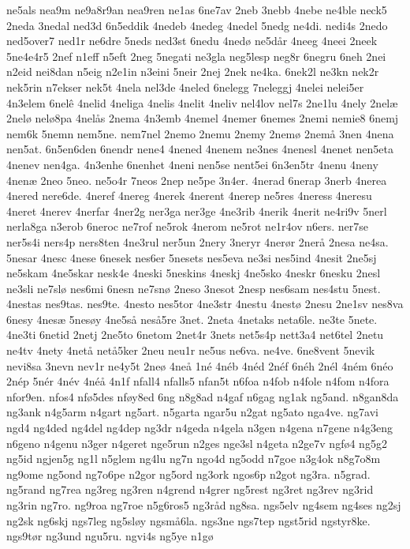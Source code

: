 {ne5als
nea9m
ne9a8r9an
nea9ren
ne1as
6ne7av
2neb
3nebb
4nebe
ne4ble
neck5
2neda
3nedal
ned3d
6n5eddik
4nedeb
4nedeg
4nedel
5nedg
ne4di.
nedi4s
2nedo
ned5over7
ned1r
ne6dre
5neds
ned3st
6nedu
4nedø
ne5dår
4neeg
4neei
2neek
5ne4e4r5
2nef
n1eff
n5eft
2neg
5negati
ne3gla
neg5lesp
neg8r
6negru
6neh
2nei
n2eid
nei8dan
n5eig
n2e1in
n3eini
5neir
2nej
2nek
ne4ka.
6nek2l
ne3kn
nek2r
nek5rin
n7ekser
nek5t
4nela
nel3de
4neled
6nelegg
7neleggj
4nelei
nelei5er
4n3elem
6nelê
4nelid
4neliga
4nelis
4nelit
4neliv
nel4lov
nel7s
2ne1lu
4nely
2nelæ
2nelø
nelø8pa
4nelås
2nema
4n3emb
4nemel
4nemer
6nemes
2nemi
nemie8
6nemj
nem6k
5nemn
nem5ne.
nem7nel
2nemo
2nemu
2nemy
2nemø
2nemå
3nen
4nena
nen5at.
6n5en6den
6nendr
nene4
4nened
4nenem
ne3nes
4nenesl
4nenet
nen5eta
4nenev
nen4ga.
4n3enhe
6nenhet
4neni
nen5se
nent5ei
6n3en5tr
4nenu
4neny
4nenæ
2neo
5neo.
ne5o4r
7neos
2nep
ne5pe
3n4er.
4nerad
6nerap
3nerb
4nerea
4nered
nere6de.
4neref
4nereg
4nerek
4nerent
4nerep
ne5res
4neress
4neresu
4neret
4nerev
4nerfar
4ner2g
ner3ga
ner3ge
4ne3rib
4nerik
4nerit
ne4ri9v
5nerl
nerla8ga
n3erob
6neroc
ne7rof
ne5rok
4nerom
ne5rot
ne1r4ov
n6ers.
ner7se
ner5s4i
ners4p
ners8ten
4ne3rul
ner5un
2nery
3neryr
4nerør
2nerå
2nesa
ne4sa.
5nesar
4nesc
4nese
6nesek
nes6er
5nesets
nes5eva
ne3si
nes5ind
4nesit
2ne5sj
ne5skam
4ne5skar
nesk4e
4neski
5neskins
4neskj
4ne5sko
4neskr
6nesku
2nesl
ne3sli
ne7slø
nes6mi
6nesn
ne7snø
2neso
3nesot
2nesp
nes6sam
nes4stu
5nest.
4nestas
nes9tas.
nes9te.
4nesto
nes5tor
4ne3str
4nestu
4nestø
2nesu
2ne1sv
nes8va
6nesy
4nesæ
5nesøy
4ne5så
neså5re
3net.
2neta
4netaks
neta6le.
ne3te
5nete.
4ne3ti
6netid
2netj
2ne5to
6netom
2net4r
3nets
net5s4p
nett3a4
net6tel
2netu
ne4tv
4nety
4netå
netå5ker
2neu
neu1r
ne5us
ne6va.
ne4ve.
6ne8vent
5nevik
nevi8sa
3nevn
nev1r
ne4y5t
2neø
4neå
1né
4néb
4néd
2néf
6néh
2nél
4ném
6néo
2nép
5nér
4név
4néå
4n1f
nfall4
nfalls5
nfan5t
n6foa
n4fob
n4fole
n4fom
n4fora
nfor9en.
nfos4
nfø5des
nføy8ed
6ng
n8g8ad
n4gaf
n6gag
ng1ak
ng5and.
n8gan8da
ng3ank
n4g5arm
n4gart
ng5art.
n5garta
ngar5u
n2gat
ng5ato
nga4ve.
ng7avi
ngd4
ng4ded
ng4del
ng4dep
ng3dr
n4geda
n4gela
n3gen
n4gena
n7gene
n4g3eng
n6geno
n4genu
n3ger
n4geret
nge5run
n2ges
nge3sl
n4geta
n2ge7v
ngfø4
ng5g2
ng5id
ngjen5g
ng1l
n5glem
ng4lu
ng7n
ngo4d
ng5odd
n7goe
n3g4ok
n8g7o8m
ng9ome
ng5ond
ng7o6pe
n2gor
ng5ord
ng3ork
ngos6p
n2got
ng3ra.
n5grad.
ng5rand
ng7rea
ng3reg
ng3ren
n4grend
n4grer
ng5rest
ng3ret
ng3rev
ng3rid
ng3rin
ng7ro.
ng9roa
ng7roe
n5g6ros5
ng3råd
ng8sa.
ngs5elv
ng4sem
ng4ses
ng2sj
ng2sk
ng6skj
ngs7leg
ng5sløy
ngsmå6la.
ngs3ne
ngs7tep
ngst5rid
ngstyr8ke.
ngs9tør
ng3und
ngu5ru.
ngvi4s
ng5ye
n1gø
}
